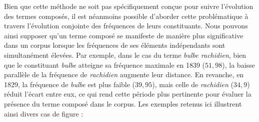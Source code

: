 Bien que cette méthode ne soit pas spécifiquement conçue pour suivre l'évolution des termes composés, il est néanmoins possible d'aborder cette problématique à travers l'évolution conjointe des fréquences de leurs constituants. Nous pouvons ainsi supposer qu'un terme composé se manifeste de manière plus significative dans un corpus lorsque les fréquences de ses éléments indépendants sont simultanément élevées. Par exemple, dans le cas du terme \textit{bulbe rachidien}, bien que le constituant \textit{bulbe} atteigne sa fréquence maximale en 1839 ($51,98$), la baisse parallèle de la fréquence de \textit{rachidien} augmente leur distance. En revanche, en 1829, la fréquence de \textit{bulbe} est plus faible ($39,95$), mais celle de \textit{rachidien} ($34,9$) réduit l'écart entre eux, ce qui rend cette période plus pertinente pour évaluer la présence du terme composé dans le corpus. Les exemples retenus ici illustrent ainsi divers cas de figure : 
